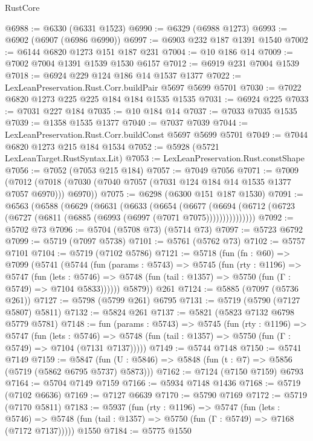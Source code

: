 \begin{lexlean}{RustCore}
\begin{coremodule}
@6988 := @6330 (@6331 @1523)
@6990 := @6329 (@6988 @1273)
@6993 := @6902 (@6907 (@6986 @6990))
@6997 := @6903 @232 @187 @1391 @1540
@7002 := @6144 @6820 @1273 @151 @187 @231
@7004 := @10 @186 @14
@7009 := @7002 @7004 @1391 @1539 @1530 @6157
@7012 := @6919 @231 @7004 @1539
@7018 := @6924 @229 @124 @186 @14 @1537 @1377
@7022 := LexLeanPreservation.Rust.Corr.buildPair @5697 @5699 @5701
@7030 := @7022 @6820 @1273 @225 @225 @184 @184 @1535 @1535
@7031 := @6924 @225
@7033 := @7031 @227 @184
@7035 := @10 @184 @14
@7037 := @7033 @7035 @1535
@7039 := @1358 @1535 @1377
@7040 := @7037 @7039
@7044 := LexLeanPreservation.Rust.Corr.buildConst @5697 @5699 @5701
@7049 := @7044 @6820 @1273 @215 @184 @1534
@7052 := @5928 (@5721 LexLeanTarget.RustSyntax.Lit)
@7053 := LexLeanPreservation.Rust.constShape
@7056 := @7052 (@7053 @215 @184)
@7057 := @7049 @7056
@7071 := @7009
    (@7012 (@7018 (@7030 (@7040 @7057 (@7031 @124 @184 @14 @1535 @1377 @7057 @6970))) @6970))
@7075 := @6298 (@6300 @151 @187 @1530)
@7091 := @6563
    (@6588
      (@6629
        (@6631
          (@6633
            (@6654
              (@6677
                (@6694 (@6712 (@6723 (@6727 (@6811 (@6885 (@6993 (@6997 (@7071 @7075)))))))))))))))
@7092 := @5702 @73
@7096 := @5704 (@5708 @73) (@5714 @73)
@7097 := @5723 @6792
@7099 := @5719 (@7097 @5738)
@7101 := @5761 (@5762 @73)
@7102 := @5757 @7101
@7104 := @5719 (@7102 @5786)
@7121 := @5718
    (fun (fn : @60) =>
    @7099
      (@5741
        (@5744
          (fun (params : @5743) =>
          @5745
            (fun (rty : @1196) =>
            @5747
              (fun (lets : @5746) =>
              @5748 (fun (tail : @1357) => @5750 (fun (Γ : @5749) => @7104 @5833))))))
        @5879))
    @261
@7124 := @5885 (@7097 (@5736 @261))
@7127 := @5798 (@5799 @261) @6795
@7131 := @5719 (@5790 (@7127 @5807) @5811)
@7132 := @5824 @261
@7137 := @5821 (@5823 @7132 @6798 @5779 @5781)
@7148 := fun (params : @5743) =>
  @5745
    (fun (rty : @1196) =>
    @5747
      (fun (lets : @5746) =>
      @5748 (fun (tail : @1357) => @5750 (fun (Γ : @5749) => @7104 (@7131 @7137)))))
@7149 := @5744 @7148
@7150 := @5741 @7149
@7159 := @5847 (fun (U : @5846) => @5848 (fun (t : @7) => @5856 (@5719 (@5862 @6795 @5737) @5873)))
@7162 := @7124 (@7150 @7159) @6793
@7164 := @5704 @7149 @7159
@7166 := @5934 @7148 @1436
@7168 := @5719 (@7102 @6636)
@7169 := @7127 @6639
@7170 := @5790 @7169
@7172 := @5719 (@7170 @5811)
@7183 := @5937
    (fun (rty : @1196) =>
    @5747
      (fun (lets : @5746) =>
      @5748 (fun (tail : @1357) => @5750 (fun (Γ : @5749) => @7168 (@7172 @7137)))))
    @1550
@7184 := @5775 @1550

\end{coremodule}
\end{lexlean}
